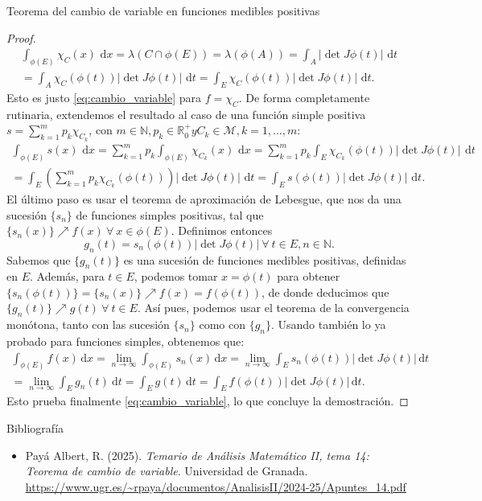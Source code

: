 \documentclass{article}
\let\originalnearrow\nearrow
\renewcommand{\nearrow}{\!\!\originalnearrow\!\!}
\begin{document}
\begin{section}{Teorema del cambio de variable en funciones medibles positivas}
\begin{proof}
\begin{multline*}
\int_{\phi(E)} \chi_C(x)\,\, \mathrm{d}x = \lambda(C \cap \phi(E)) = \lambda(\phi(A)) = \int_A \lvert \det J\phi(t) \rvert\,\, \mathrm{d}t \\
= \int_A \chi_C(\phi(t)) \lvert \det J\phi(t) \rvert\,\, \mathrm{d}t = \int_E \chi_C(\phi(t)) \lvert \det J\phi(t) \rvert\,\, \mathrm{d}t.
\end{multline*}
Esto es justo \eqref{eq:cambio_variable} para $f = \chi_C$.
De forma completamente rutinaria, extendemos el resultado al caso de una función simple positiva $s = \sum_{k=1}^m p_k\chi_{C_k}$, con $m \in \mathbb{N}, p_k \in \mathbb{R}_0^+ y C_k \in \mathcal{M}, k = 1, \dots, m$:
\begin{multline*}
\int_{\phi(E)} s(x)\,\, \mathrm{d}x = \sum_{k=1}^m p_k \int_{\phi(E)} \chi_{C_k}(x)\,\, \mathrm{d}x = \sum_{k=1}^m p_k \int_E \chi_{C_k}(\phi(t)) \lvert \det J\phi(t) \rvert\,\ \mathrm{d}t \\
= \int_E \left(\sum_{k=1}^m p_k \chi_{C_k}(\phi(t))\right) \lvert \det J\phi(t) \rvert\,\, \mathrm{d}t = \int_E s(\phi(t)) \lvert \det J\phi(t) \rvert\,\, \mathrm{d}t.
\end{multline*}
El último paso es usar el teorema de aproximación de Lebesgue, que nos da una sucesión $\{s_n\}$ de funciones simples positivas, tal que $\{s_n(x)\}\nearrow f(x) \ \forall \ x \in \phi(E)$. Definimos entonces
\[
g_n(t) = s_n(\phi(t)) \lvert \det J\phi(t) \rvert \ \forall \ t \in E, n \in \mathbb{N}.
\]
Sabemos que $\{g_n(t)\}$ es una sucesión de funciones medibles positivas, definidas en $E$. Además, para $t \in E$, podemos tomar $x = \phi(t)$ para obtener $\{s_n(\phi(t))\} = \{s_n(x)\}\nearrow f(x) = f(\phi(t))$, de donde deducimos que $\{g_n(t)\}\nearrow g(t) \ \forall \ t \in E$. Así pues, podemos usar el teorema de la convergencia monótona, tanto con las sucesión $\{s_n\}$ como con $\{g_n\}$. Usando también lo ya probado para funciones simples, obtenemos que:
\begin{multline*}
\int_{\phi(E)}f(x)\, \mathrm{d} x = \lim_{n\to \infty}\int_{\phi(E)}s_n(x)\, \mathrm{d}x = \lim_{n\to \infty}\int_E s_n(\phi(t)) \lvert \det J\phi(t) \rvert\, \mathrm{d}t \\
= \lim_{n\to \infty}\int_E g_n(t)\ \mathrm{d}t = \int_E g(t)\, \mathrm{d}t = \int_E f(\phi(t)) \lvert \det J\phi(t) \rvert\, \mathrm{d}t.
\end{multline*}
Esto prueba finalmente \eqref{eq:cambio_variable}, lo que concluye la demostración.
\end{proof}
\end{section}
\begin{section}{Bibliografía}
\begin{itemize}
    \item Payá Albert, R. (2025). \textit{Temario de Análisis Matemático II, tema 14: Teorema de cambio de variable}. Universidad de Granada. \url{https://www.ugr.es/~rpaya/documentos/AnalisisII/2024-25/Apuntes_14.pdf}
\end{itemize}
\end{section}
\end{document}
